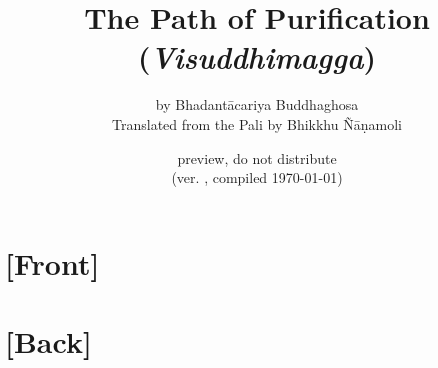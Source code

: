 \documentclass[a4paper]{book}
\def\vismCommitHref{\href{https://github.com/eudoxos/vism/commit/\vismCommit}{\vismCommit}}
\newif\ifplastex\plastexfalse
\def\frontmatter{\setcounter{part}{-1}\part{[Front]}} %
\def\backmatter{\setcounter{part}{-1}\part{[Back]}}
\let\origbackmatter\backmatter
\def\backmatter{\origbackmatter\pagestyle{vismNoBody}}
\begin{document}
	\title{The Path of Purification \\ (\emph{Visuddhimagga})}
	\date{preview, do not distribute \\ (ver. \vismCommitHref, compiled \today)}
	\ifplastex
		\author{by \\ Bhadantācariya Buddhaghosa \and Translated from the Pali by \\ Bhikkhu Ñāṇamoli}
	\else
		\author{by Bhadantācariya Buddhaghosa \\ Translated from the Pali by Bhikkhu Ñāṇamoli}
	\fi
	\maketitle

	\frontmatter
		\tableofcontents
		\def\thesection{\arabic{section}}
		
	\backmatter
		
		
		
\end{document}
